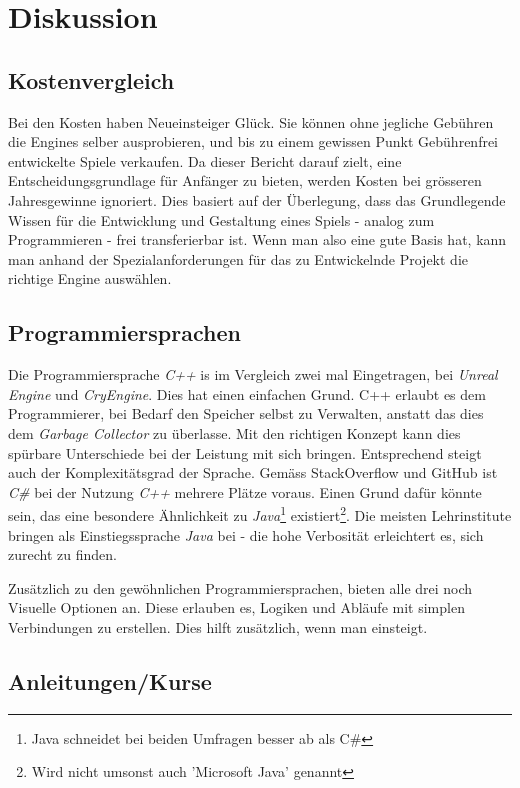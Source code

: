 \chapter{Diskussion}

\section{Kostenvergleich}

Bei den Kosten haben Neueinsteiger Glück. Sie können ohne jegliche Gebühren die Engines selber ausprobieren, und bis zu einem gewissen Punkt Gebührenfrei entwickelte Spiele verkaufen. Da dieser Bericht darauf zielt, eine Entscheidungsgrundlage für Anfänger zu bieten, werden Kosten bei grösseren Jahresgewinne ignoriert. Dies basiert auf der Überlegung, dass das Grundlegende Wissen für die Entwicklung und Gestaltung eines Spiels - analog zum Programmieren - frei transferierbar ist. Wenn man also eine gute Basis hat, kann man anhand der Spezialanforderungen für das zu Entwickelnde Projekt die richtige Engine auswählen.

\section{Programmiersprachen}

Die Programmiersprache \emph{C++} is im Vergleich zwei mal Eingetragen, bei \emph{Unreal Engine} und \emph{CryEngine}. Dies hat einen einfachen Grund. C++ erlaubt es dem Programmierer, bei Bedarf den Speicher selbst zu Verwalten, anstatt das dies dem \emph{Garbage Collector} zu überlasse. Mit den richtigen Konzept kann dies spürbare Unterschiede bei der Leistung mit sich bringen. Entsprechend steigt auch der Komplexitätsgrad der Sprache. Gemäss StackOverflow\cite{stackoverflow_stack_2020} und GitHub\cite{github_state_2020} ist \emph{C\#} bei der Nutzung \emph{C++} mehrere Plätze voraus. Einen Grund dafür könnte sein, das eine besondere Ähnlichkeit zu \emph{Java}\footnote{Java schneidet bei beiden Umfragen besser ab als C\#} existiert\footnote{Wird nicht umsonst auch 'Microsoft Java' genannt}. Die meisten Lehrinstitute bringen als Einstiegssprache \emph{Java} bei - die hohe Verbosität erleichtert es, sich zurecht zu finden.

\par Zusätzlich zu den gewöhnlichen Programmiersprachen, bieten alle drei noch Visuelle Optionen an. Diese erlauben es, Logiken und Abläufe mit simplen Verbindungen zu erstellen. Dies hilft zusätzlich, wenn man einsteigt. 

\section{Anleitungen/Kurse}
